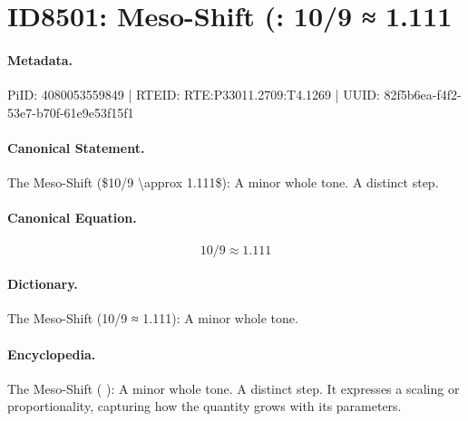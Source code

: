 \section*{ID8501: Meso-Shift (: 10/9 ≈ 1.111}
\paragraph{Metadata.}
PiID: 4080053559849 | RTEID: RTE:P33011.2709:T4.1269 | UUID: 82f5b6ea-f4f2-53e7-b70f-61e9e53f15f1

\paragraph{Canonical Statement.}
The Meso-Shift (\$10/9 \textbackslash{}approx 1.111\$): A minor whole tone. A distinct step.

\paragraph{Canonical Equation.}
\[
10/9 \approx 1.111
\]

\paragraph{Dictionary.}
The Meso-Shift (10/9 ≈ 1.111): A minor whole tone.

\paragraph{Encyclopedia.}
The Meso-Shift ( ): A minor whole tone. A distinct step. It expresses a scaling or proportionality, capturing how the quantity grows with its parameters.
